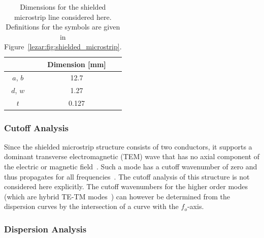 \begin{table}[b]
 \centering
 \caption{Dimensions for the shielded microstrip line considered here. Definitions for the symbols are given in Figure~\ref{lezar:fig:shielded_microstrip}.}
 \label{lezar:tab:shielded_microstrip_dimensions}
 \begin{tabular}{|c|c|}
  \hline
   & Dimension [mm]\\
  \hline
   $a$, $b$ & 12.7\\
   $d$, $w$ & 1.27\\
   $t$ & 0.127\\
  \hline
 \end{tabular}
\end{table}

\subsubsection{Cutoff Analysis}

Since the shielded microstrip structure consists of two conductors, it
supports a dominant transverse electromagnetic (TEM) wave that has no
axial component of the electric or magnetic field~\cite{Poz2005}. Such
a mode has a cutoff wavenumber of zero and
thus propagates for all frequencies~\cite{Jin2002,PelCoc1998}. The
cutoff analysis of this structure is not considered here
explicitly. The cutoff wavenumbers for the higher order modes (which
are hybrid TE-TM modes~\cite{Poz2005}) can however be determined from
the dispersion curves by the intersection of a curve with the
$f_o$-axis.

\subsubsection{Dispersion Analysis}

